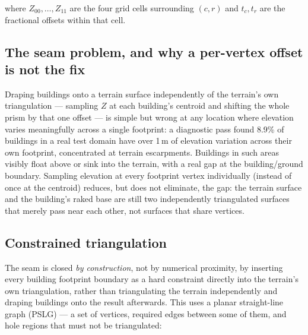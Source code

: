 \documentclass[11pt]{article}
\begin{document}
where $Z_{00},\dots,Z_{11}$ are the four grid cells surrounding $(c,r)$ and $t_c, t_r$ are the
fractional offsets within that cell.

\subsection{The seam problem, and why a per-vertex offset is not the fix}

Draping buildings onto a terrain surface independently of the terrain's own triangulation ---
sampling $Z$ at each building's centroid and shifting the whole prism by that one offset ---
is simple but wrong at any location where elevation varies meaningfully across a single
footprint: a diagnostic pass found 8.9\% of buildings in a real test domain have over 1\,m of
elevation variation across their own footprint, concentrated at terrain escarpments. Buildings
in such areas visibly float above or sink into the terrain, with a real gap at the
building/ground boundary. Sampling elevation at every footprint vertex individually (instead
of once at the centroid) reduces, but does not eliminate, the gap: the terrain surface and the
building's raked base are still two independently triangulated surfaces that merely pass near
each other, not surfaces that share vertices.

\subsection{Constrained triangulation}

The seam is closed \emph{by construction}, not by numerical proximity, by inserting every
building footprint boundary as a hard constraint directly into the terrain's own triangulation,
rather than triangulating the terrain independently and draping buildings onto the result
afterwards. This uses a planar straight-line graph (PSLG) --- a set of vertices, required
edges between some of them, and hole regions that must not be triangulated:
\end{document}
